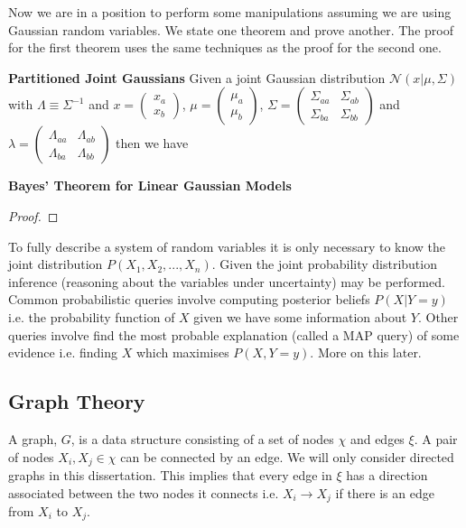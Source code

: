 \documentclass[../masters.tex]{subfiles}
\begin{document}
Now we are in a position to perform some manipulations assuming we are using Gaussian random variables. We state one theorem and prove another. The proof for the first theorem uses the same techniques as the proof for the second one.
\begin{thrm}
\textbf{Partitioned Joint Gaussians}
Given a joint Gaussian distribution $\mathcal{N}(x|\mu,\Sigma)$ with $\Lambda \equiv \Sigma^{-1}$ and $x=\begin{pmatrix}
x_a \\ x_b
\end{pmatrix}$, $\mu=\begin{pmatrix}
\mu_a \\ \mu_b
\end{pmatrix}$, $\Sigma=\begin{pmatrix}
\Sigma_{aa} & \Sigma_{ab} \\ \Sigma_{ba} & \Sigma_{bb}
\end{pmatrix}$ and $\lambda = \begin{pmatrix}
\Lambda_{aa} & \Lambda_{ab} \\ \Lambda_{ba} & \Lambda_{bb}
\end{pmatrix}$ then we have
\label{thrm_joint_gaussians}
\end{thrm}

\begin{thrm}
\textbf{Bayes' Theorem for Linear Gaussian Models}

\label{thrm_bayes_gaussians}
\end{thrm}
\begin{proof}

\end{proof}

To fully describe a system of random variables it is only necessary to know the joint distribution $P(X_1,X_2,...,X_n)$. Given the joint probability distribution inference (reasoning about the variables under uncertainty) may be performed. Common probabilistic queries involve computing posterior beliefs $P(X|Y=y)$ i.e. the probability function of $X$ given we have some information about $Y$. Other queries involve find the most probable explanation (called a MAP query) of some evidence i.e. finding $X$ which maximises $P(X, Y=y)$. More on this later. 

\subsection{Graph Theory}
A graph, $G$, is a data structure consisting of a set of nodes $\chi$ and edges $\xi$. A pair of nodes $X_i, X_j \in \chi$ can be connected by an edge. We will only consider directed graphs in this dissertation. This implies that every edge in $\xi$ has a direction associated between the two nodes it connects i.e. $X_i \rightarrow X_j$ if there is an edge from $X_i$ to $X_j$.
\end{document}

